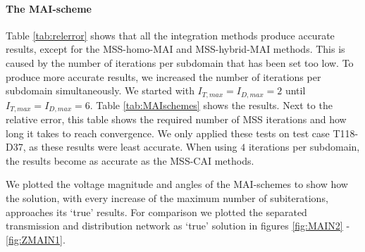 
\paragraph{The MAI-scheme}
Table \ref{tab:relerror} shows that all the integration methods produce accurate results, except for the MSS-homo-MAI and MSS-hybrid-MAI methods. This is caused by the number of iterations per subdomain that has been set too low. To produce more accurate results, we increased the number of iterations per subdomain simultaneously. We started with $I_{T,max}=I_{D,max}=2$ until $I_{T,max}=I_{D,max}=6$.  Table \ref{tab:MAIschemes} shows the results. Next to the relative error, this table shows the required number of MSS iterations and how long it takes to reach convergence. We only applied these tests on test case T118-D37, as these results were least accurate. When using $4$ iterations per subdomain, the results become as accurate as the MSS-CAI methods. 

We plotted the voltage magnitude and angles of the MAI-schemes to show how the solution, with every increase of the maximum number of subiterations, approaches its `true' results. For comparison we plotted the separated transmission and distribution network as `true' solution in figures \ref{fig:MAIN2} - \ref{fig:ZMAIN1}. 

